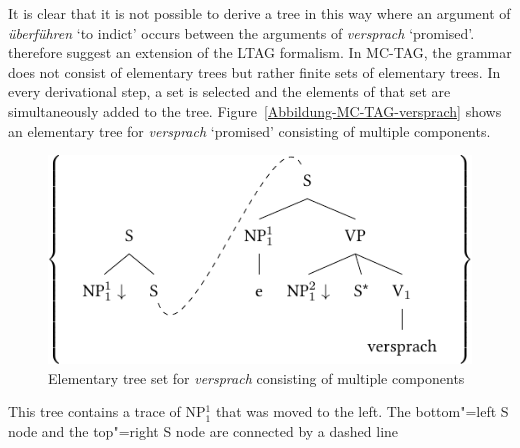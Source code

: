 \addlines
It is clear that it is not possible to derive a tree in this way where an argument of \emph{überführen} `to indict' occurs between the arguments of \emph{versprach}
`promised'. \citet*{JBR2000a} therefore suggest an extension of the LTAG formalism. In MC-TAG, the grammar does not consist of elementary trees but rather
finite sets of elementary trees. In every derivational step, a set is selected and the elements of that set are simultaneously added to the tree.
Figure~\vref{Abbildung-MC-TAG-versprach} shows an elementary tree for \emph{versprach} `promised' consisting of multiple components.
\begin{figure}
\includegraphics{Figures/tag-versprach-lsp-crop}
\caption{\label{Abbildung-MC-TAG-versprach}Elementary tree set for \emph{versprach} consisting of multiple components}
\end{figure}%
This tree contains a trace of NP$_1^1$ that was moved to the left. The bottom"=left S node and the top"=right S node are connected by a dashed line

